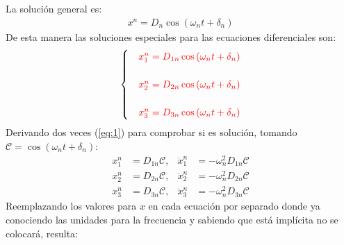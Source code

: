 \begin{multicols}{2}
\begin{enumerate}[leftmargin=15pt]
    La solución general es:
    \begin{align}
        x^{n} = D_n \cos\left(\omega_n t + \delta_n\right) \label{eq:1}
    \end{align}
    De esta manera las soluciones especiales para las ecuaciones diferenciales son:
    \begin{equation*}
        \begin{cases}
            &\textcolor{rojo}{x^{n}_{1} = D_{1n} \cos\left(\omega_n t + \delta_n\right)}\\
            \\
            &\textcolor{rojo}{x^{n}_{2} = D_{2n} \cos\left(\omega_n t + \delta_n\right)}\\
            \\
            &\textcolor{rojo}{x^{n}_{3} = D_{3n} \cos\left(\omega_n t + \delta_n\right)}
        \end{cases}
    \end{equation*}
    Derivando dos veces (\ref{eq:1}) para comprobar si es solución, tomando $\mathscr{C} = \cos\left(\omega_n t + \delta_n\right)$:
    \begin{align*}
        x^{n}_{1} &= D_{1n} \mathscr{C}, & \ddot{x}^{n}_{1} &= -\omega^{2}_{n} D_{1n} \mathscr{C}\\
        x^{n}_{2} &= D_{2n} \mathscr{C}, & \ddot{x}^{n}_{2} &= -\omega^{2}_{n} D_{2n} \mathscr{C}\\
        x^{n}_{3} &= D_{3n} \mathscr{C}, & \ddot{x}^{n}_{3} &= -\omega^{2}_{n} D_{3n} \mathscr{C}
    \end{align*}
    Reemplazando los valores para $x$ en cada ecuación por separado donde ya conociendo las unidades para la frecuencia y sabiendo que está implícita no se colocará, resulta:


\end{enumerate}
\end{multicols}
